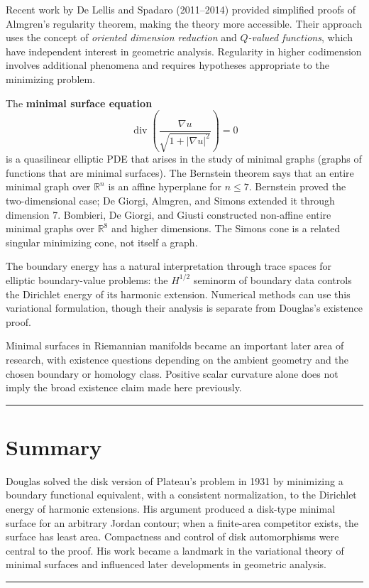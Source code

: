 Recent work by De Lellis and Spadaro (2011--2014) provided simplified
proofs of Almgren's regularity theorem, making the theory more
accessible. Their approach uses the concept of \emph{oriented dimension
reduction} and \emph{$Q$-valued functions}, which have independent
interest in geometric analysis. Regularity in higher codimension
involves additional phenomena and requires hypotheses appropriate to
the minimizing problem.

The \textbf{minimal surface equation}
\[
\operatorname{div}\!\left(\frac{\nabla u}{\sqrt{1+|\nabla u|^2}}\right) = 0
\]
is a quasilinear elliptic PDE that arises in the study of minimal
graphs (graphs of functions that are minimal surfaces). The Bernstein
theorem says that an entire minimal graph over $\mathbb{R}^n$ is an
affine hyperplane for $n\leq 7$. Bernstein proved the two-dimensional
case; De Giorgi, Almgren, and Simons extended it through dimension 7.
Bombieri, De Giorgi, and Giusti constructed non-affine entire minimal
graphs over $\mathbb{R}^8$ and higher dimensions. The Simons cone is a
related singular minimizing cone, not itself a graph.

The boundary energy has a natural interpretation through trace spaces
for elliptic boundary-value problems: the $H^{1/2}$ seminorm of boundary
data controls the Dirichlet energy of its harmonic extension. Numerical
methods can use this variational formulation, though their analysis is
separate from Douglas's existence proof.

Minimal surfaces in Riemannian manifolds became an important later area
of research, with existence questions depending on the ambient geometry
and the chosen boundary or homology class. Positive scalar curvature
alone does not imply the broad existence claim made here previously.

\begin{center}\rule{0.5\linewidth}{0.5pt}\end{center}

\section*{Summary}

Douglas solved the disk version of Plateau's problem in 1931 by
minimizing a boundary functional equivalent, with a consistent
normalization, to the Dirichlet energy of harmonic extensions. His
argument produced a disk-type minimal surface for an arbitrary Jordan
contour; when a finite-area competitor exists, the surface has least
area. Compactness and control of disk automorphisms were central to the
proof. His work became a landmark in the variational theory of minimal
surfaces and influenced later developments in geometric analysis.

\begin{center}\rule{0.5\linewidth}{0.5pt}\end{center}
